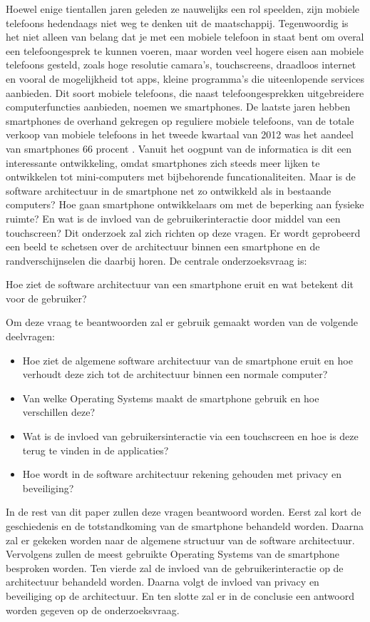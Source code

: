 Hoewel enige tientallen jaren geleden ze nauwelijks een rol speelden, zijn mobiele telefoons hedendaags niet weg te denken uit de maatschappij.
Tegenwoordig is het niet alleen van belang dat je met een mobiele telefoon in staat bent om overal een telefoongesprek te kunnen voeren, maar worden veel hogere eisen aan mobiele telefoons gesteld, zoals hoge resolutie camara's, touchscreens, draadloos internet en vooral de mogelijkheid tot apps, kleine programma's die uiteenlopende services aanbieden.
Dit soort mobiele telefoons, die naast telefoongesprekken uitgebreidere computerfuncties aanbieden, noemen we smartphones.
De laatste jaren hebben smartphones de overhand gekregen op reguliere mobiele telefoons, van de totale verkoop van mobiele telefoons in het tweede kwartaal van 2012 was het aandeel van smartphones 66 procent \citep{GsmHelpDesk}.
Vanuit het oogpunt van de informatica is dit een interessante ontwikkeling, omdat smartphones zich steeds meer lijken te ontwikkelen tot mini-computers met bijbehorende funcationaliteiten.
Maar is de software architectuur in de smartphone net zo ontwikkeld als in bestaande computers?
Hoe gaan smartphone ontwikkelaars om met de beperking aan fysieke ruimte?
En wat is de invloed van de gebruikerinteractie door middel van een touchscreen?
Dit onderzoek zal zich richten op deze vragen.
Er wordt geprobeerd een beeld te schetsen over de architectuur binnen een smartphone en de randverschijnselen die daarbij horen.
De centrale onderzoeksvraag is: 

Hoe ziet de software architectuur van een smartphone eruit en wat betekent dit voor de gebruiker?

Om deze vraag te beantwoorden zal er gebruik gemaakt worden van de volgende deelvragen:

\begin{itemize}
   \item Hoe ziet de algemene software architectuur van de smartphone eruit en hoe verhoudt deze zich tot de architectuur binnen een normale computer?
   \item Van welke Operating Systems maakt de smartphone gebruik en hoe verschillen deze?
   \item Wat is de invloed van gebruikersinteractie via een touchscreen en hoe is deze terug te vinden in de applicaties?
   \item Hoe wordt in de software architectuur rekening gehouden met privacy en beveiliging?
\end{itemize}

In de rest van dit paper zullen deze vragen beantwoord worden.
Eerst zal kort de geschiedenis en de totstandkoming van de smartphone behandeld worden.
Daarna zal er gekeken worden naar de algemene structuur van de software architectuur.
Vervolgens zullen de meest gebruikte Operating Systems van de smartphone besproken worden.
Ten vierde zal de invloed van de gebruikerinteractie op de architectuur behandeld worden.
Daarna volgt de invloed van privacy en beveiliging op de architectuur.
En ten slotte zal er in de conclusie een antwoord worden gegeven op de onderzoeksvraag.

